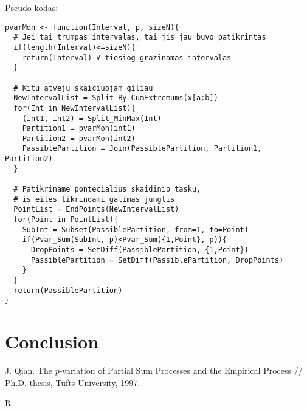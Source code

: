 \documentclass[12pt, a4paper]{article}
\numberwithin{equation}{section}
\begin{document}
Pseudo kodas:
\begin{lstlisting}
pvarMon <- function(Interval, p, sizeN){
  # Jei tai trumpas intervalas, tai jis jau buvo patikrintas 
  if(length(Interval)<=sizeN){
    return(Interval) # tiesiog grazinamas intervalas  
  }

  # Kitu atveju skaiciuojam giliau
  NewIntervalList = Split_By_CumExtremums(x[a:b])
  for(Int in NewIntervalList){
    (int1, int2) = Split_MinMax(Int)
    Partition1 = pvarMon(int1)
    Partition2 = pvarMon(int2)
    PassiblePartition = Join(PassiblePartition, Partition1, Partition2)
  }

  # Patikriname pontecialius skaidinio tasku,
  # is eiles tikrindami galimas jungtis
  PointList = EndPoints(NewIntervalList)
  for(Point in PointList){
    SubInt = Subset(PassiblePartition, from=1, to=Point)
    if(Pvar_Sum(SubInt, p)<Pvar_Sum({1,Point}, p)){
      DropPoints = SetDiff(PassiblePartition, {1,Point})
      PassiblePartition = SetDiff(PassiblePartition, DropPoints)
    }  
  }  
  return(PassiblePartition) 
}
\end{lstlisting}


\section{Conclusion}
  
\begin{thebibliography}{99}  
   J. Qian. The $p$-variation of Partial Sum Processes
  and the Empirical Process // Ph.D. thesis, Tufts University, 1997.
  
    R
  
\end{thebibliography}
\end{document}
